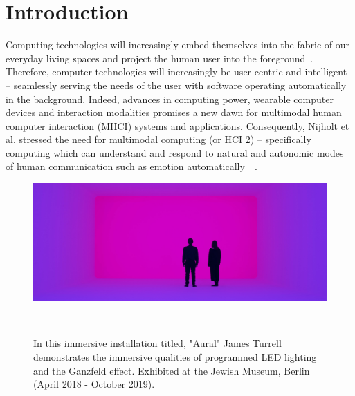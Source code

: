 \documentclass{sigchi}
\begin{document}
\section{Introduction}

Computing technologies will increasingly embed themselves into the fabric of our everyday living spaces and project the human user into the foreground~\cite{6634207}. Therefore, computer technologies will increasingly be user-centric and intelligent – seamlessly serving the needs of the user with software operating automatically in the background. Indeed, advances in computing power, wearable computer devices and interaction modalities promises a new dawn for multimodal human computer interaction (MHCI) systems and applications. Consequently, Nijholt et al. stressed the need for multimodal computing (or HCI 2) – specifically computing which can understand and respond to natural and autonomic modes of human communication such as emotion automatically~\cite{pantic2008human}~\cite{6634207}.

\begin{figure}
  \centering
  \includegraphics[width=1.75\columnwidth]{figures/turrell}
  \caption{In this immersive installation titled, "Aural" James Turrell demonstrates the immersive qualities of programmed LED lighting and the Ganzfeld effect. Exhibited at the Jewish Museum, Berlin (April 2018 - October 2019).}~\label{fig:figure2}
\end{figure}
\end{document}
